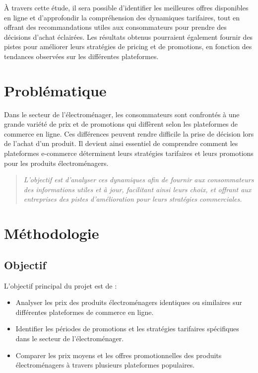 \documentclass[a4paper, 12pt, oneside]{report}
\begin{document}
\bigskip

À travers cette étude, il sera possible d’identifier les meilleures offres disponibles en ligne et d’approfondir la compréhension des dynamiques tarifaires, tout en offrant des recommandations utiles aux consommateurs pour prendre des décisions d’achat éclairées. Les résultats obtenus pourraient également fournir des pistes pour améliorer leurs stratégies de pricing et de promotions, en fonction des tendances observées sur les différentes plateformes.


\chapter{Problématique}
Dans le secteur de l’électroménager, les consommateurs sont confrontés à une grande variété de prix et de promotions qui diffèrent selon les plateformes de commerce en ligne. Ces différences peuvent rendre difficile la prise de décision lors de l'achat d'un produit. Il devient ainsi essentiel de comprendre comment les plateformes e-commerce déterminent leurs stratégies tarifaires et leurs promotions pour les produits électroménagers.

\begin{quote}
    \textit{L'objectif est d'analyser ces dynamiques afin de fournir aux consommateurs des informations utiles et à jour, facilitant ainsi leurs choix, et offrant aux entreprises des pistes d'amélioration pour leurs stratégies commerciales.}
\end{quote}


\chapter{Méthodologie}

\section{Objectif}
L'objectif principal du projet est de :
\begin{itemize}
    \item Analyser les prix des produits électroménagers identiques ou similaires sur différentes plateformes de commerce en ligne.
    \item Identifier les périodes de promotions et les stratégies tarifaires spécifiques dans le secteur de l’électroménager.
    \item Comparer les prix moyens et les offres promotionnelles des produits électroménagers à travers plusieurs plateformes populaires.
\end{itemize}
\end{document}
